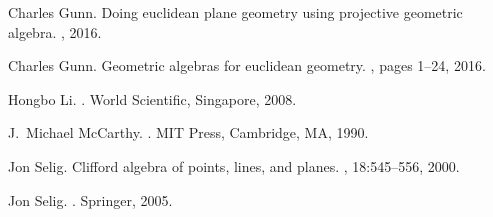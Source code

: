 \documentclass{birkjour}
\begin{document}
\begin{thebibliography}{Gun16b}
Charles Gunn.
\newblock Doing euclidean plane geometry using projective geometric algebra.
, 2016.

Charles Gunn.
\newblock Geometric algebras for euclidean geometry.
, pages 1--24, 2016.

Hongbo Li.
.
\newblock World Scientific, Singapore, 2008.

J.~Michael McCarthy.
.
\newblock MIT Press, Cambridge, MA, 1990.

Jon Selig.
\newblock Clifford algebra of points, lines, and planes.
, 18:545--556, 2000.

Jon Selig.
.
\newblock Springer, 2005.

\end{thebibliography}
\end{document}
